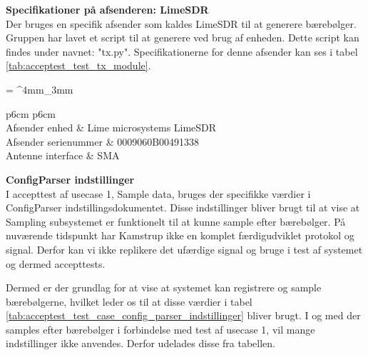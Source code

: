 \begin{appendices}
\textbf{Specifikationer på afsenderen: LimeSDR} \\
Der bruges en specifik afsender som kaldes LimeSDR til at generere bærebølger.
Gruppen har lavet et script til at generere ved brug af enheden. Dette script kan findes under navnet: "tx.py".
Specifikationerne for denne afsender kan ses i tabel \ref{tab:acceptest_test_tx_module}.

\begin{table}[H]
	\renewcommand{\arraystretch}{2}
	\centering
	\sffamily
	\tabulinesep = ^4mm_3mm
	\begin{tabu}{  p{6cm}   p{6cm} }
		 \\
		Afsender enhed & Lime microsystems LimeSDR \\
		Afsender serienummer & 0009060B00491338 \\
		Antenne interface & SMA \\
	\end{tabu}
	\caption{Afsender enhed}
	\label{tab:acceptest_test_tx_module}
\end{table}


\textbf{ConfigParser indstillinger} \\
I accepttest af usecase 1, Sample data, bruges der specifikke værdier i ConfigParser indstillingsdokumentet. Disse indstillinger bliver brugt til at vise at Sampling subsystemet er funktionelt til at kunne sample efter bærebølger. På nuværende tidspunkt har Kamstrup ikke en komplet færdigudviklet protokol og signal. Derfor kan vi ikke replikere det ufærdige signal og bruge i test af systemet og dermed accepttests.

Dermed er der grundlag for at vise at systemet kan registrere og sample bærebølgerne, hvilket leder os til at disse værdier i tabel
 \ref{tab:acceptest_test_case_config_parser_indstillinger} bliver brugt. I og med der samples efter bærebølger i forbindelse med test af usecase 1, vil mange indstillinger ikke anvendes. Derfor udelades disse fra tabellen.


\end{appendices}
